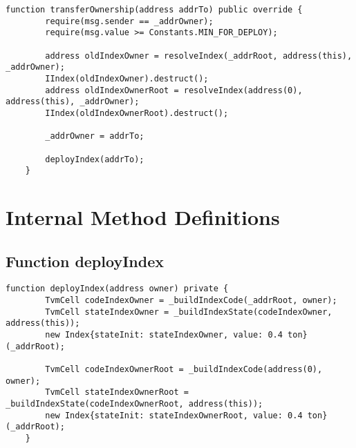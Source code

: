 


\begin{lstlisting}[firstnumber=35]
    function transferOwnership(address addrTo) public override {
        require(msg.sender == _addrOwner);
        require(msg.value >= Constants.MIN_FOR_DEPLOY);

        address oldIndexOwner = resolveIndex(_addrRoot, address(this), _addrOwner);
        IIndex(oldIndexOwner).destruct();
        address oldIndexOwnerRoot = resolveIndex(address(0), address(this), _addrOwner);
        IIndex(oldIndexOwnerRoot).destruct();

        _addrOwner = addrTo;

        deployIndex(addrTo);
    }
\end{lstlisting}

\section{Internal Method Definitions}


\subsection{Function deployIndex}


\begin{lstlisting}[firstnumber=49]
    function deployIndex(address owner) private {
        TvmCell codeIndexOwner = _buildIndexCode(_addrRoot, owner);
        TvmCell stateIndexOwner = _buildIndexState(codeIndexOwner, address(this));
        new Index{stateInit: stateIndexOwner, value: 0.4 ton}(_addrRoot);

        TvmCell codeIndexOwnerRoot = _buildIndexCode(address(0), owner);
        TvmCell stateIndexOwnerRoot = _buildIndexState(codeIndexOwnerRoot, address(this));
        new Index{stateInit: stateIndexOwnerRoot, value: 0.4 ton}(_addrRoot);
    }
\end{lstlisting}
